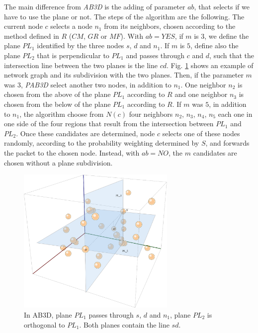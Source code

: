 \documentclass[journal,comsoc]{IEEEtran}
\begin{document}
The main difference from \emph{AB3D} is the adding of parameter \(ab\), that selects if we have to use the plane or not.
The steps of the algorithm are the following. The current node \(c\) selects a node \(n_1\) from its neighbors, chosen according to the method defined in \(R\) (\(CM\), \(GR\) or \(MF\)). With \(ab = YES\), if \(m\) is \(3\), we define the plane \(PL_1\) identified by the three nodes \(s\), \(d\) and \(n_1\). If \(m\) is \(5\), define also the plane \(PL_2\) that is perpendicular to \(PL_1\) and passes through \(c\) and \(d\), such that the intersection line between the two planes is the line \(cd\). Fig. \ref{fig:ab3d} shows an example of network graph and its subdivision with the two planes.
Then, if the parameter \(m\) was \(3\), \emph{PAB3D} select another two nodes, in addition to \(n_1\). One neighbor \(n_2\) is chosen from the above of the plane \(PL_1\) according to \(R\) and one neighbor \(n_3\) is chosen from the below of the plane \(PL_1\) according to \(R\). If \(m\) was \(5\), in addition to \(n_1\), the algorithm choose from \(N(c)\) four neighbors \(n_2\), \(n_3\), \(n_4\), \(n_5\) each one in one side of the four regions that result from the intersection between \(PL_1\) and \(PL_2\). Once these candidates are determined, node \(c\) selects one of these nodes randomly, according to the probability weighting determined by \(S\), and forwards the packet to the chosen node.
Instead, with \(ab = NO\), the \(m\) candidates are chosen without a plane subdivision.

\begin{figure}[!t]
\centering
\includegraphics[width=3.0in]{images/ab3d}
\caption{In AB3D, plane \(PL_1\) passes through \(s\), \(d\) and \(n_1\), plane \(PL_2\) is orthogonal to \(PL_1\). Both planes contain the line \(sd\).}
  \label{fig:ab3d}
\end{figure}
\end{document}
